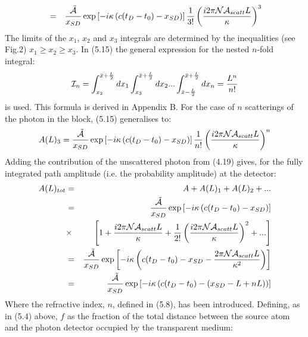 \documentclass [12pt]{article}
\begin{document}
{\begin{eqnarray}
     & = & \frac{\tilde{{\cal A}}}{x_{SD}}
     \exp\left[ - i \kappa\left(c(t_D-t_0)-x_{SD}\right)\right]
     \frac{1}{3!} \left(\frac{i 2 \pi {\cal N}{\cal A}_{scatt} L}{\kappa}\right)^3  
 \end{eqnarray}
  The limits of the $x_1$, $x_2$ and $x_3$ integrals are determined by the inequalities
  (see Fig.2) $x_1 \ge x_2 \ge x_3$. In (5.15) the general expression for the 
  nested $n$-fold integral: 
  \begin{equation}
  {\cal I}_n =   \int_{x_2}^{\bar{x} +\frac{L}{2}} d x_1  \int_{x_3}^{\bar{x} +\frac{L}{2}} d x_2
   ...\int_{\bar{x} -\frac{L}{2}}^{\bar{x} +\frac{L}{2}} d x_n = \frac{L^n}{n!}
   \end{equation}
   is used. This formula is derived in Appendix B.
   For the case of $n$ scatterings of the photon in the block, (5.15) generalises to:
   \begin{equation}
     A(L)_3  =  \frac{\tilde{{\cal A}}}{x_{SD}}
   \exp\left[ - i \kappa\left(c(t_D-t_0)-x_{SD}\right)\right]
    \frac{1}{n!} \left(\frac{i 2 \pi {\cal N}{\cal A}_{scatt} L}{\kappa}\right)^n 
   \end{equation}
    Adding the contribution of the unscattered photon from (4.19) gives, for the fully integrated
    path amplitude (i.e. the probability amplitude) at the detector:
   \begin{eqnarray}
      A(L)_{tot} & = & A +  A(L)_1 +  A(L)_2 + ...  \nonumber \\
          &  = & \frac{\tilde{{\cal A}}}{x_{SD}}
   \exp\left[ - i \kappa\left(c(t_D-t_0)-x_{SD}\right)\right] \nonumber \\
        & \times & \left[ 1+\frac{i 2 \pi {\cal N}{\cal A}_{scatt} L}{\kappa}
        +  \frac{1}{2!} \left(\frac{i 2 \pi {\cal N}{\cal A}_{scatt} L}{\kappa}\right)^2 
         +...\right]  \nonumber \\
    & = & \frac{\tilde{{\cal A}}}{x_{SD}}
   \exp \left[ - i \kappa\left(c(t_D-t_0)-x_{SD}-\frac{2 \pi {\cal N}{\cal A}_{scatt} L}{\kappa^2}
    \right)\right] \nonumber \\
    & = & \frac{\tilde{{\cal A}}}{x_{SD}}
   \exp  \left[ - i \kappa\left(c(t_D-t_0)-(x_{SD}-L+nL)\right)\right]  
   \end{eqnarray}
    Where the refractive index, $n$, defined in (5.8), has been introduced. Defining, as in
    (5.4) above, $f$ as the fraction of the total distance between the source atom and the
    photon detector occupied by the transparent medium:
  \begin{equation}

\end{equation}}
\end{document}
